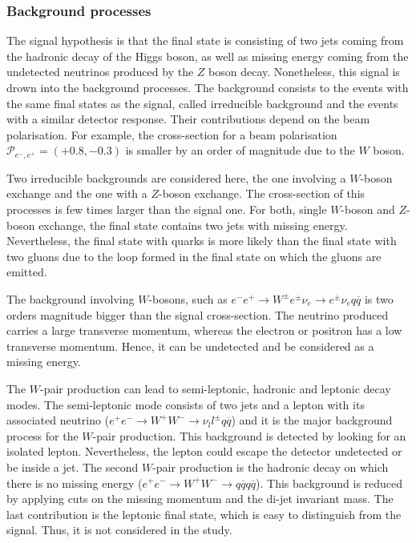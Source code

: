   \subsubsection{Background processes}

    The signal hypothesis is that the final state is consisting of two jets coming from the hadronic decay of the Higgs boson, as well as missing energy coming from the undetected neutrinos produced by the $Z$ boson decay.
    Nonetheless, this signal is drown into the background processes.
    The background consists to the events with the same final states as the signal, called irreducible background and the events with a similar detector response.
    Their contributions depend on the beam polarisation.
    For example, the cross-section for a beam polarisation $\mathcal{P}_{e^-,e^+} = (+0.8,-0.3)$ is smaller by an order of magnitude due to the $W$ boson.

    Two irreducible backgrounds are considered here, the one involving a $W$-boson exchange and the one with a $Z$-boson exchange.
    The cross-section of this processes is few times larger than the signal one.
    For both, single $W$-boson and $Z$-boson exchange, the final state contains two jets with missing energy.
    Nevertheless, the final state with quarks is more likely than the final state with two gluons due to the loop formed in the final state on which the gluons are emitted.

    The background involving $W$-bosons, such as $e^{-}e^{+} \rightarrow W^{\pm}e^{\pm}\nu_{e} \rightarrow e^{\pm}\nu_{e}q\overline{q}$ is two orders magnitude bigger than the signal cross-section.
    The neutrino produced carries a large transverse momentum, whereas the electron or positron has a low transverse momentum.
    Hence, it can be undetected and be considered as a missing energy.
    
    The $W$-pair production can lead to semi-leptonic, hadronic and leptonic decay modes.
    The semi-leptonic mode consists of two jets and a lepton with its associated neutrino ($e^{+}e^{-} \rightarrow W^+W^- \rightarrow \nu_{l}l^{\pm}q\overline{q}$) and it is the major background process for the $W$-pair production.
    This background is detected by looking for an isolated lepton.
    Nevertheless, the lepton could escape the detector undetected or be inside a jet.
    The second $W$-pair production is the hadronic decay on which there is no missing energy ($e^{+}e^{-} \rightarrow W^+W^- \rightarrow q\overline{q} q\overline{q}$).
    This background is reduced by applying cuts on the missing momentum and the di-jet invariant mass.
    The last contribution is the leptonic final state, which is easy to distinguish from the signal.
    Thus, it is not considered in the study. 

